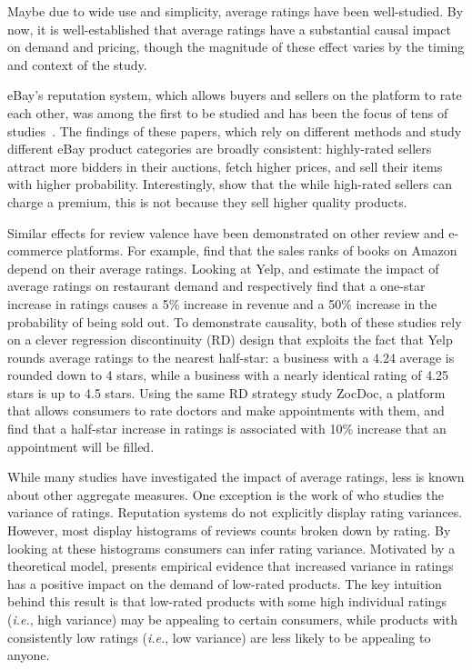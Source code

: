 \documentclass[letter,12pt]{article}
\begin{document}
Maybe due to wide use and simplicity, average ratings have been well-studied.
By now, it is well-established that average ratings have a substantial causal
impact on demand and pricing, though the magnitude of these effect varies by
the timing and context of the study.

eBay's reputation system, which allows buyers and sellers on the platform to
rate each other, was among the first to be studied and has been the focus of
tens of studies~\citep{ba2002evidence,houser2006reputation,lucking2007pennies,eaton2002value,bajari2003winner,kalyanam2001return,mcdonald2002reputation,cabral2010dynamics,dewally2006reputation,jin2006price}.
The findings of these papers, which rely on different methods and study
different eBay product categories are broadly consistent: highly-rated sellers
attract more bidders in their auctions, fetch higher prices, and sell their
items with higher probability. Interestingly, \citet{jin2006price} show that
the while high-rated sellers can charge a premium, this is not because they
sell higher quality products.

Similar effects for review valence have been demonstrated on other review and
e-commerce platforms. For example, \citet{chevalier2006effect} find that the
sales ranks of books on Amazon depend on their average ratings. Looking at
Yelp, \citet{luca2016reviews} and \citet{anderson2012learning} estimate the
impact of average ratings on restaurant demand and respectively find that a
one-star increase in ratings causes a 5\% increase in revenue and a 50\%
increase in the probability of being sold out. To demonstrate causality, both
of these studies rely on a clever regression discontinuity (RD) design that
exploits the fact that Yelp rounds average ratings to the nearest half-star: a
business with a 4.24 average is rounded down to 4 stars, while a business with
a nearly identical rating of 4.25 stars is up to 4.5 stars. Using the same RD
strategy \citet{luca2013digitizing} study ZocDoc, a platform that allows
consumers to rate doctors and make appointments with them, and find that a
half-star increase in ratings is associated with 10\% increase that an
appointment will be filled.

While many studies have investigated the impact of average ratings, less is
known about other aggregate measures. One exception is the work of
\citet{sun2012variance} who studies the variance of ratings. Reputation
systems do not explicitly display rating variances. However, most display
histograms of reviews counts broken down by rating. By looking at these
histograms consumers can infer rating variance. Motivated by a theoretical
model, \citet{sun2012variance} presents empirical evidence that increased
variance in ratings has a positive impact on the demand of low-rated products.
The key intuition behind this result is that low-rated products with some high
individual ratings (\emph{i.e.}, high variance) may be appealing to certain
consumers, while products with consistently low ratings (\emph{i.e.}, low
variance) are less likely to be appealing to anyone.
\end{document}
